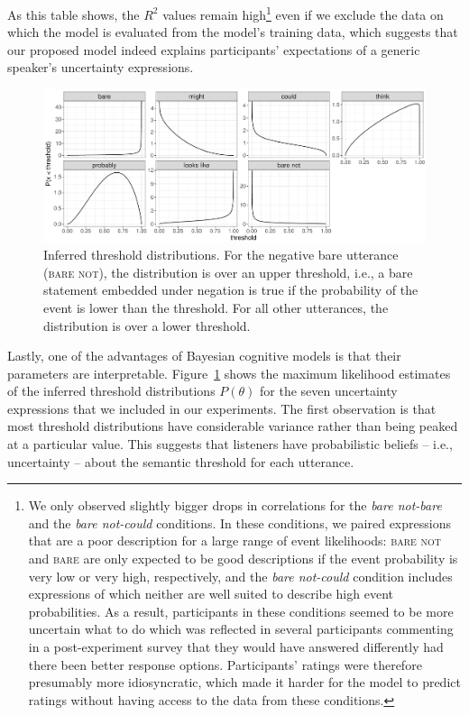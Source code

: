 As this table shows, the $R^2$ values remain high\footnote{We only observed slightly bigger drops in correlations for the \textit{bare not-bare} and the \textit{bare not-could} conditions. In these conditions, we paired expressions that are a poor description for a large range of event likelihoods: \textsc{bare not} and \textsc{bare} are only expected to be good descriptions if the event probability is very low or very high, respectively, and the \textit{bare not-could} condition includes expressions of which neither are well suited to describe high event probabilities. As a result, participants in these conditions seemed to be more uncertain what to do which was reflected in several participants commenting in a post-experiment survey that they would have answered differently had there been better response options. Participants' ratings were therefore presumably more idiosyncratic, which made it harder for the model to predict ratings without having access to the data from these conditions.} even if we exclude the data on which the model is evaluated from the model's training data, 
which suggests that our proposed model indeed explains
participants' expectations of a generic speaker's uncertainty expressions. 

\begin{figure}[th!]
\includegraphics[width=\textwidth]{plots/fig-7-threshold-distributions-prior.pdf}
\caption{Inferred threshold distributions. For the negative bare utterance (\textsc{bare not}), the distribution is over an upper threshold, i.e., a bare statement embedded under negation is true if the probability of the event is lower than the threshold. For all other utterances, the distribution is over a lower threshold.
\label{fig:threshold-distributions}}
\end{figure}

Lastly, one of the advantages of Bayesian cognitive models is that their parameters are interpretable. Figure~\ref{fig:threshold-distributions} shows the 
maximum likelihood estimates of the inferred threshold distributions $P(\theta)$ for the seven uncertainty expressions that we included in our experiments.
The first observation is that most threshold distributions have considerable variance rather than being peaked at a particular value. This suggests that
listeners have probabilistic beliefs -- i.e., uncertainty -- about the semantic threshold for each utterance.

